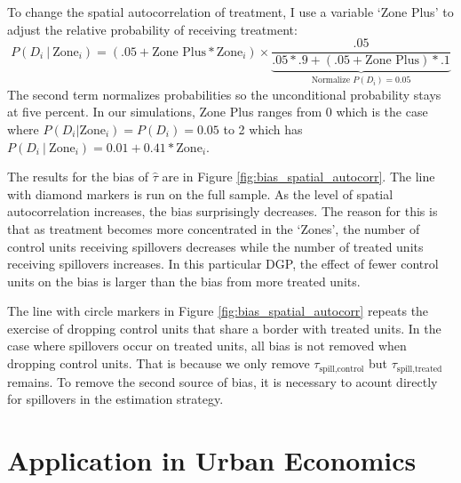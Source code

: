 \documentclass[11pt]{article}
\begin{document}
To change the spatial autocorrelation of treatment, I use a variable `Zone Plus' to adjust the relative probability of receiving treatment: 
\begin{equation}
    \label{eq:cond_prob}
    P(D_i \ \vert \ \text{Zone}_i) = (.05 + \text{Zone Plus} * \text{Zone}_i) \times \underbrace{\frac{.05}{.05 * .9 + (.05 + \text{Zone Plus}) * .1}}_{\text{Normalize } P(D_i) = 0.05}
\end{equation}
The second term normalizes probabilities so the unconditional probability stays at five percent. In our simulations, Zone Plus ranges from 0 which is the case where $P(D_i \vert \text{Zone}_i) = P(D_i) = 0.05$ to 2 which has $P(D_i \ \vert \ \text{Zone}_i) = 0.01 + 0.41 * \text{Zone}_i$.

The results for the bias of $\hat{\tau}$ are in Figure \ref{fig:bias_spatial_autocorr}. The line with diamond markers is run on the full sample. As the level of spatial autocorrelation increases, the bias surprisingly decreases. The reason for this is that as treatment becomes more concentrated in the `Zones', the number of control units receiving spillovers decreases while the number of treated units receiving spillovers increases. In this particular DGP, the effect of fewer control units on the bias is larger than the bias from more treated units. 

The line with circle markers in Figure \ref{fig:bias_spatial_autocorr} repeats the exercise of dropping control units that share a border with treated units. In the case where spillovers occur on treated units, all bias is not removed when dropping control units. That is because we only remove $\tau_{\text{spill,control}}$ but $\tau_{\text{spill,treated}}$ remains. To remove the second source of bias, it is necessary to acount directly for spillovers in the estimation strategy. 






\section{Application in Urban Economics}
\label{sec:tva}
\end{document}
